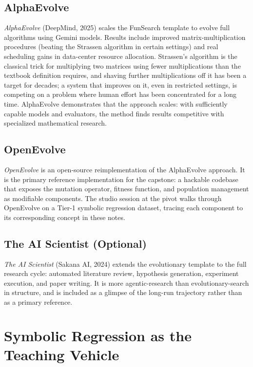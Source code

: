 \subsection{AlphaEvolve}

\emph{AlphaEvolve} (DeepMind, 2025) scales the FunSearch template to evolve full algorithms using Gemini models.
Results include improved matrix-multiplication procedures (beating the Strassen algorithm in certain settings) and real scheduling gains in data-center resource allocation.
Strassen's algorithm is the classical trick for multiplying two matrices using fewer multiplications than the textbook definition requires, and shaving further multiplications off it has been a target for decades; a system that improves on it, even in restricted settings, is competing on a problem where human effort has been concentrated for a long time.
AlphaEvolve demonstrates that the approach scales: with sufficiently capable models and evaluators, the method finds results competitive with specialized mathematical research.

\subsection{OpenEvolve}

\emph{OpenEvolve} is an open-source reimplementation of the AlphaEvolve approach.
It is the primary reference implementation for the capstone: a hackable codebase that exposes the mutation operator, fitness function, and population management as modifiable components.
The studio session at the pivot walks through OpenEvolve on a Tier-1 symbolic regression dataset, tracing each component to its corresponding concept in these notes.

\subsection{The AI Scientist (Optional)}

\emph{The AI Scientist} (Sakana AI, 2024) extends the evolutionary template to the full research cycle: automated literature review, hypothesis generation, experiment execution, and paper writing.
It is more agentic-research than evolutionary-search in structure, and is included as a glimpse of the long-run trajectory rather than as a primary reference.

\section{Symbolic Regression as the Teaching Vehicle}
\label{section:SymbolicRegression}

